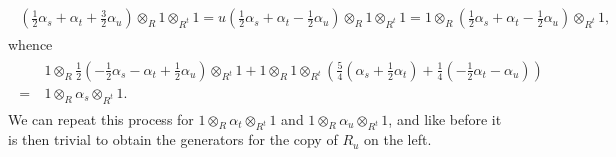 \begin{example}
\begin{align*}
\begin{split}
\end{split}
\end{align*}
\begin{align*}
\begin{split}
\left(\frac{1}{2}\alpha_s + \alpha_t + \frac{3}{2}\alpha_u\right) \otimes_R 1 \otimes_{R^t} 1 = u\!\left(\frac{1}{2}\alpha_s + \alpha_t - \frac{1}{2}\alpha_u\right) \otimes_R 1 \otimes_{R^t} 1 = 1 \otimes_R \left(\frac{1}{2}\alpha_s + \alpha_t - \frac{1}{2}\alpha_u\right) \otimes_{R^t} 1,
\end{split}
\end{align*}
\noindent whence
\begin{align*}
\begin{split}
&\ 1 \otimes_R \frac{1}{2}\left(-\frac{1}{2}\alpha_s - \alpha_t + \frac{1}{2}\alpha_u\right) \otimes_{R^t} 1 + 1 \otimes_R 1 \otimes_{R^t} \left(\frac{5}{4}\left(\alpha_s + \frac{1}{2}\alpha_t\right) + \frac{1}{4}\left(-\frac{1}{2}\alpha_t - \alpha_u\right)\right)\\
=&\ 1 \otimes_R \alpha_s \otimes_{R^t} 1.
\end{split}
\end{align*}
\noindent We can repeat this process for $1 \otimes_R \alpha_t \otimes_{R^t} 1$ and $1 \otimes_R \alpha_u \otimes_{R^t} 1$, and like before it is then trivial to obtain the generators for the copy of $R_u$ on the left. %

\end{example}
